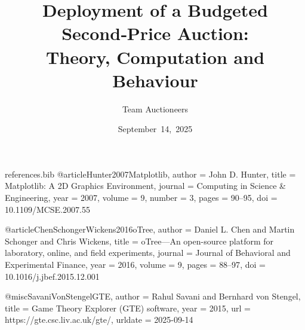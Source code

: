 \begin{filecontents*}{references.bib}
@article{Hunter2007Matplotlib,
  author    = {John D. Hunter},
  title     = {Matplotlib: A 2D Graphics Environment},
  journal   = {Computing in Science & Engineering},
  year      = {2007},
  volume    = {9},
  number    = {3},
  pages     = {90--95},
  doi       = {10.1109/MCSE.2007.55}
}

@article{ChenSchongerWickens2016oTree,
  author    = {Daniel L. Chen and Martin Schonger and Chris Wickens},
  title     = {oTree---An open-source platform for laboratory, online, and field experiments},
  journal   = {Journal of Behavioral and Experimental Finance},
  year      = {2016},
  volume    = {9},
  pages     = {88--97},
  doi       = {10.1016/j.jbef.2015.12.001}
}

@misc{SavaniVonStengelGTE,
  author    = {Rahul Savani and Bernhard von Stengel},
  title     = {Game Theory Explorer (GTE) software},
  year      = {2015},
  url       = {https://gte.csc.liv.ac.uk/gte/},
  urldate   = {2025-09-14}
}
\end{filecontents*}

\documentclass[11pt]{article}
\usepackage{amsmath,amssymb}
\usepackage{graphicx}
\usepackage{booktabs}
\usepackage{hyperref}
\usepackage{array}
\usepackage{float}
\usepackage{csquotes}
\usepackage[authordate]{biblatex-chicago}



\hypersetup{
    colorlinks=true,
    linkcolor=blue,
    urlcolor=blue,
    citecolor=blue
}



\title{Deployment of a Budgeted Second‑Price Auction:\\Theory, Computation and Behaviour}

\author{Team Auctioneers}

\date{September~14,~2025}

\begin{abstract}
This report is split across discipline tracks. See economist/ (theory and citations), computational\_scientist/ (how to run, Colab notebook), and behavioral\_scientist/ (oTree deployment and ethics). Figures are generated into figures/ and referenced here.
\end{abstract}

\maketitle

